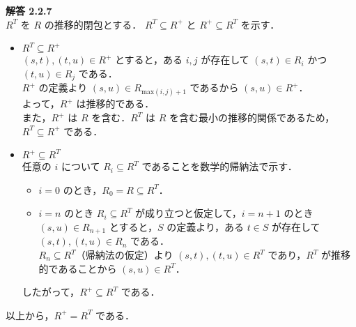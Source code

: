 \documentclass[a4paper,11pt,fleqn,dvipdfmx]{article}
\newcommand{\ansja}[1]{\noindent\textbf{解答 #1}\\[2mm]}
\newcommand{\qed}[0]{\hfill\fbox{}}
\begin{document}
    \pagebreak

    \ansja{2.2.7}
        $R^{T}$ を $R$ の推移的閉包とする． $R^{T} \subseteq R^{+}$ と $R^{+} \subseteq R^{T}$ を示す．
        \begin{itemize}
            \item $R^{T} \subseteq R^{+}$ \\[2mm]
            $(s,t),(t,u) \in R^{+}$ とすると，ある $i,j$ が存在して $(s,t) \in R_i$ かつ $(t,u) \in R_j$ である． \\
            $R^{+}$ の定義より $(s,u) \in R_{\mathrm{max}(i,j)+1}$ であるから $(s,u) \in R^{+}$． \\
            よって，$R^{+}$ は推移的である． \\
            また，$R^{+}$ は $R$ を含む．$R^{T}$ は $R$ を含む最小の推移的関係であるため，$R^{T} \subseteq R^{+}$ である．
            \item $R^{+} \subseteq R^{T}$ \\[2mm]
            任意の $i$ について $R_i \subseteq R^{T}$ であることを数学的帰納法で示す．
            \begin{itemize}
                \item $i=0$ のとき，$R_0 = R \subseteq R^{T}$．
                \item $i=n$ のとき $R_i \subseteq R^{T}$ が成り立つと仮定して，$i=n+1$ のとき \\
                $(s,u) \in R_{n+1}$ とすると，$S$ の定義より，ある $t \in S$ が存在して $(s,t),(t,u) \in R_n$ である． \\
                $R_n \subseteq R^{T}$（帰納法の仮定）より $(s,t),(t,u) \in R^{T}$ であり，$R^{T}$ が推移的であることから $(s,u) \in R^{T}$．
            \end{itemize}
            したがって，$R^{+} \subseteq R^{T}$ である．
        \end{itemize}
        以上から，$R^{+} = R^{T}$ である．\qed

    \vspace{10mm}
\end{document}

